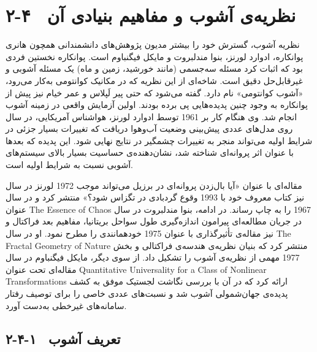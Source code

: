 \section{۲-۴  نظریه‌ی آشوب و مفاهیم بنیادی آن}

نظریه آشوب، گسترش خود را بیشتر مدیون پژوهش‌های دانشمندانی همچون هانری پوانکاره، ادوارد لورنز، بنوا مندلبروت و مایکل فیگنباوم است. پوانکاره نخستین فردی بود که اثبات کرد مسئله سه‌جسمی (مانند خورشید، زمین و ماه) یک مسئله آشوبی و غیرقابل‌حل دقیق است. شاخه‌ای از این نظریه که در مکانیک کوانتومی به‌کار می‌رود، «آشوب کوانتومی» نام دارد. گفته می‌شود که حتی پیر لَپلاس و عمر خیام نیز پیش از پوانکاره به وجود چنین پدیده‌هایی پی برده بودند. اولین آزمایش واقعی در زمینه آشوب توسط ادوارد لورنز، هواشناس آمریکایی، در سال ‎1961‎ انجام شد. وی هنگام کار بر روی مدل‌های عددی پیش‌بینی وضعیت آب‌وهوا دریافت که تغییرات بسیار جزئی در شرایط اولیه می‌تواند منجر به تغییرات چشمگیر در نتایج نهایی شود. این پدیده که بعدها با عنوان اثر پروانه‌ای شناخته شد، نشان‌دهنده‌ی حساسیت بسیار بالای سیستم‌های آشوبی نسبت به شرایط اولیه است\cite{ref46}.

لورنز در سال ‎1972‎ مقاله‌ای با عنوان «آیا بال‌زدن پروانه‌ای در برزیل می‌تواند موجب وقوع گردبادی در تگزاس شود؟» منتشر کرد و در سال ‎1993‎ نیز کتاب معروف خود با عنوان ‎The‎ ‎Essence‎ ‎of‎ ‎Chaos‎ را به چاپ رساند. در ادامه، بنوا مندلبروت در سال ‎1967‎ در جریان مطالعه‌ای پیرامون اندازه‌گیری طول سواحل بریتانیا، مفاهیم بعد فراکتال و خودهمانندی  را مطرح نمود. او در سال ‎1975‎ نیز مقاله‌ی تأثیرگذاری با عنوان ‎The‎ ‎Fractal‎ ‎Geometry‎ ‎of‎ ‎Nature‎ منتشر کرد که بنیان نظریه‌ی هندسه‌ی فراکتالی و بخش مهمی از نظریه‌ی آشوب را تشکیل داد. از سوی دیگر، مایکل فیگنباوم در سال ‎1977‎ مقاله‌ای تحت عنوان ‎Quantitative‎ ‎Universality‎ ‎for‎ ‎a‎ ‎Class‎ ‎of‎ ‎Nonlinear‎ ‎Transformations‎ ارائه کرد که در آن با بررسی نگاشت لجستیک موفق به کشف پدیده‌ی جهان‌شمولی آشوب شد و نسبت‌های عددی خاصی را برای توصیف رفتار سامانه‌های غیرخطی به‌دست آورد\cite{ref45}.

\subsection{۲-۴-۱  تعریف آشوب}

